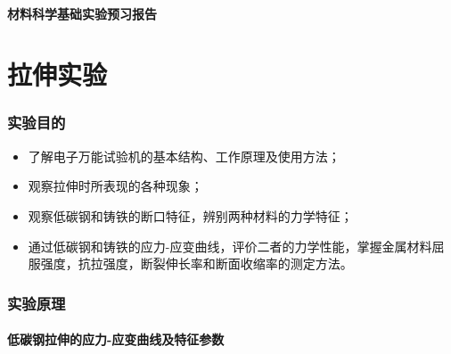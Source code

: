 \documentclass[a4paper,utf8]{article}
\begin{document}
\begin{center}
    {\mbox{}\\[7em]\bfseries\songti%
    材料科学基础实验预习报告}\\[34mm]
\end{center}
\newpage
\part{拉伸实验}
\section{实验目的}
\begin{itemize}
    \item 了解电子万能试验机的基本结构、工作原理及使用方法；
    \item 观察拉伸时所表现的各种现象；
    \item 观察低碳钢和铸铁的断口特征，辨别两种材料的力学特征；
    \item 通过低碳钢和铸铁的应力-应变曲线，评价二者的力学性能，掌握金属材料屈服强度，抗拉强度，断裂伸长率和断面收缩率的测定方法。
\end{itemize}
\section{实验原理}%
\subsection{低碳钢拉伸的应力-应变曲线及特征参数}
\end{document}
